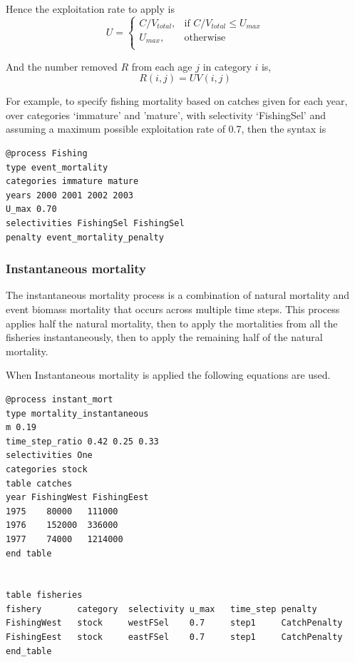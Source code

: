Hence the exploitation rate to apply is 
\begin{equation}
U = \begin{cases}
  C/V_{total}, & \text{if $C/V_{total} \leq U_{max}$} \\
  U_{max}, & \text{otherwise}\\ 
  \end{cases} 
\end{equation}

And the number removed $R$ from each age $j$ in category $i$ is,
\begin{equation}
  R(i,j) = UV(i,j)
\end{equation}

For example, to specify fishing mortality based on catches given for each year, over categories `immature' and 'mature', with selectivity `FishingSel' and assuming a maximum possible exploitation rate of 0.7, then the syntax is

{\small{\begin{verbatim}
@process Fishing
type event_mortality
categories immature mature
years 2000 2001 2002 2003
U_max 0.70
selectivities FishingSel FishingSel
penalty event_mortality_penalty
\end{verbatim}}}

\subsubsection*{Instantaneous mortality}
The instantaneous mortality process is a combination of natural mortality and event biomass mortality that occurs across multiple time steps. This process applies half the natural mortality, then to apply the mortalities from all the fisheries instantaneously, then to apply the remaining half of the natural mortality. 

When Instantaneous mortality is applied the following equations are used.\\
{\small{\begin{verbatim}
@process instant_mort
type mortality_instantaneous
m 0.19
time_step_ratio 0.42 0.25 0.33
selectivities One
categories stock
table catches
year FishingWest FishingEest
1975	80000	111000
1976	152000	336000
1977	74000	1214000
end table


table fisheries
fishery       category  selectivity u_max   time_step penalty
FishingWest   stock     westFSel    0.7     step1     CatchPenalty
FishingEest   stock     eastFSel    0.7     step1     CatchPenalty
end_table
\end{verbatim}}}
